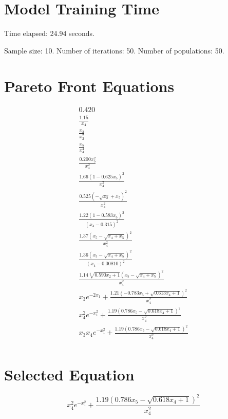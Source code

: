 \documentclass{article}
\begin{document}
\section*{Model Training Time}
Time elapsed: 24.94 seconds.

Sample size: 10.
Number of iterations: 50.
Number of populations: 50.

\section*{Pareto Front Equations}
\begin{align*}
0.420 \\
\frac{1.15}{x_{4}} \\
\frac{x_{3}}{x_{2}^{2}} \\
\frac{x_{5}}{x_{4}^{4}} \\
\frac{0.200 x_{5}^{2}}{x_{4}^{2}} \\
\frac{1.66 \left(1 - 0.625 x_{5}\right)^{2}}{x_{4}^{2}} \\
\frac{0.525 \left(- \sqrt{x_{2}} + x_{5}\right)^{2}}{x_{4}^{2}} \\
\frac{1.22 \left(1 - 0.583 x_{5}\right)^{2}}{\left(x_{4} - 0.315\right)^{2}} \\
\frac{1.37 \left(x_{5} - \sqrt{x_{4} + x_{5}}\right)^{2}}{x_{4}^{2}} \\
\frac{1.36 \left(x_{5} - \sqrt{x_{4} + x_{5}}\right)^{2}}{\left(x_{4} - 0.00810\right)^{2}} \\
\frac{1.14 \sqrt[4]{0.590 x_{2} + 1} \left(x_{5} - \sqrt{x_{4} + x_{5}}\right)^{2}}{x_{4}^{2}} \\
x_{3} e^{- 2 x_{1}} + \frac{1.21 \left(- 0.783 x_{5} + \sqrt{0.613 x_{4} + 1}\right)^{2}}{x_{4}^{2}} \\
x_{4}^{2} e^{- x_{1}^{2}} + \frac{1.19 \left(0.786 x_{5} - \sqrt{0.618 x_{4} + 1}\right)^{2}}{x_{4}^{2}} \\
x_{3} x_{4} e^{- x_{1}^{2}} + \frac{1.19 \left(0.786 x_{5} - \sqrt{0.618 x_{4} + 1}\right)^{2}}{x_{4}^{2}} \\
\end{align*}

\section*{Selected Equation}
\[ x_{4}^{2} e^{- x_{1}^{2}} + \frac{1.19 \left(0.786 x_{5} - \sqrt{0.618 x_{4} + 1}\right)^{2}}{x_{4}^{2}} \]
\end{document}
